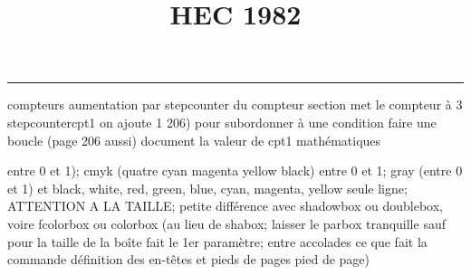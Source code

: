 \documentclass[11pt]{article}%
\title{\bf \vspace{-1cm} HEC 1982} %
\author{} %
\date{} %
\renewcommand{\headrulewidth}{0pt}%
\renewcommand{\footrulewidth}{0.4pt}%
\begin{document}
\maketitle %
\vspace{-1.2cm}\hrule %
\thispagestyle{fancy}

\vspace*{.4cm}


compteurs%
aumentation par stepcounter du compteur section%
met le compteur à 3%
stepcounter{cpt1} on ajoute 1%
206) pour subordonner à une condition %
faire une boucle (page 206 aussi) %
document la valeur de cpt1 
mathématiques\newcommand{\ch}{\operatorname{ch}} 
\newcommand{\sh}{\operatorname{sh}}
\renewcommand{\tanh}{\operatorname{th}}
\renewcommand{\sinh}{\operatorname{sh}}
\renewcommand{\cosh}{\operatorname{ch}}
\newcommand{\argsh}{\operatorname{argsh}}
\newcommand{\argch}{\operatorname{argch}}
\newcommand{\argth}{\operatorname{argth}}
\newcommand{\Id}{\operatorname{Id}}
\renewcommand{\leq}{\leq}
\renewcommand{\geq}{\geq }

\newcommand{\dlim}{\lim}
\newcommand{\dsum}{\sum}
\newcommand{\dprod}{\prod}



entre 0 et 1); cmyk (quatre cyan magenta yellow black) entre 0 et 1;
gray (entre 0 et 1) et black, white, red, green, blue, cyan, magenta,
yellow%
seule ligne; ATTENTION A LA TAILLE; petite différence avec shadowbox ou
doublebox, voire fcolorbox ou colorbox (au lieu de shabox; laisser le
parbox tranquille sauf pour la taille de la boîte
\newcommand{\Tbox}[1]{\begin{center} \shabox{\parbox{0.6
\linewidth}{#1}} \end{center}} %
fait le 1er paramètre; entre accolades ce que fait la commande
définition des en-têtes et pieds de pages\pagestyle{fancy}
\chead{}
\rfoot[ \ \thepage]{\thepage}
\cfoot{}
\lfoot{}
\thispagestyle{fancy} %
pied de page)\renewcommand{\footrulewidth}{0.4pt}
\renewcommand{\headrulewidth}{0.4pt}
\end{document}
